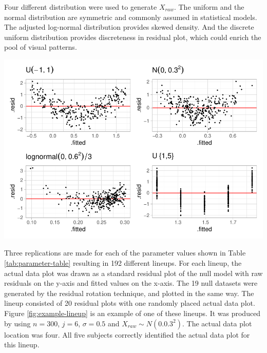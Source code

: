 \documentclass[]{interact}
\theoremstyle{plain}%
\theoremstyle{definition}
\theoremstyle{remark}
\begin{document}
Four different distribution were used to generate \(X_{raw}\). The
uniform and the normal distribution are symmetric and commonly assumed
in statistical models. The adjusted log-normal distribution provides
skewed density. And the discrete uniform distribution provides
discreteness in residual plot, which could enrich the pool of visual
patterns.

\includegraphics{paper_comparison_files/figure-latex/different-dist-1.pdf}

Three replications are made for each of the parameter values shown in
Table \ref{tab:parameter-table} resulting in 192 different lineups. For
each lineup, the actual data plot was drawn as a standard residual plot
of the null model with raw residuals on the y-axis and fitted values on
the x-axis. The 19 null datasets were generated by the residual rotation
technique, and plotted in the same way. The lineup consisted of 20
residual plots with one randomly placed actual data plot. Figure
\ref{fig:example-lineup} is an example of one of these lineups. It was
produced by using \(n = 300\), \(j = 6\), \(\sigma = 0.5\) and
\(X_{raw} \sim N(0.0.3^2)\). The actual data plot location was four. All
five subjects correctly identified the actual data plot for this lineup.
\end{document}
